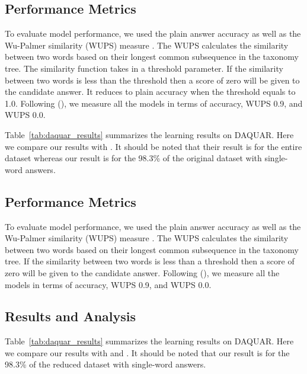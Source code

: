 \documentclass{article}
\renewcommand{\#}[1]{\textbf{#1}}
\newcommand{\shortcite}[1]{\citeauthor{#1} (\citeyear{#1})}
\begin{document}
\subsection{Performance Metrics}
To evaluate model performance, we used the plain answer accuracy as well as the Wu-Palmer similarity (WUPS) measure \cite{wu94, malinowski14b}. The WUPS calculates the similarity between two words based on their longest common subsequence in the taxonomy tree. The similarity function takes in a threshold parameter. If the similarity between two words is less than the threshold then a score of zero will be given to the candidate answer. It reduces to plain accuracy when the threshold equals to 1.0. Following \shortcite{malinowski14b}, we measure all the models in terms of accuracy, WUPS 0.9, and WUPS 0.0.

Table~\ref{tab:daquar_results} summarizes the learning results on DAQUAR. Here
we compare our results with \cite{malinowski14b}. It should be noted that
their result is for the entire dataset whereas our result is for the 98.3\% of the original dataset with single-word answers.

\subsection{Performance Metrics}
To evaluate model performance, we used the plain answer 
accuracy as well as 
the Wu-Palmer similarity (WUPS) measure \cite{wu94, malinowski14b}. 
The WUPS calculates the similarity between two words based 
on their longest common 
subsequence in the taxonomy tree. If the similarity 
between two words is less than a threshold then 
a score of zero will be given to the candidate answer. 
Following \shortcite{malinowski14b}, 
we measure all the models in terms of accuracy, WUPS 0.9, and WUPS 0.0.

\subsection{Results and Analysis}
Table~\ref{tab:daquar_results} summarizes the learning results on DAQUAR. Here
we compare our results with \cite{malinowski14b} and \cite{malinowski15}. 
It should be noted that our result is for the 98.3\% of 
the reduced dataset with single-word answers.
\end{document}
